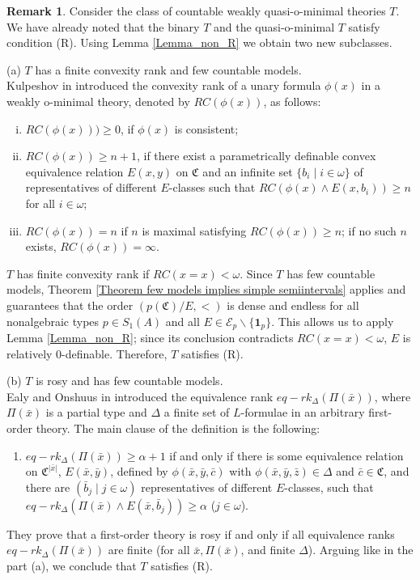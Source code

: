 \documentclass{amsart}
\theoremstyle{definition}
\theoremstyle{definition}
\newtheorem{Remark}[Theorem]{Remark}
\newcommand{\Mon}{\mathfrak C}
\begin{document}
\begin{Remark}\label{Rematk_finconv_rosywom} Consider the class of countable weakly quasi-o-minimal theories $T$. We have already noted that the binary $T$ and the quasi-o-minimal $T$ satisfy condition (R). Using Lemma \ref{Lemma_non_R} we obtain two new subclasses.

\smallskip 
(a) $T$ has a finite convexity rank and few countable models.\\
Kulpeshov in \cite{kulpeshov1998} introduced the convexity rank of a unary formula $\phi(x)$ in a weakly o-minimal theory, denoted by $RC(\phi(x))$, as follows:
\begin{enumerate}[(i)]
    \item   $RC(\phi(x))) \geqslant  0$, if $\phi(x)$ is consistent;
    \item   $RC(\phi(x))\geqslant n+1$, if there exist a parametrically deﬁnable convex equivalence relation $E(x, y)$ on $\Mon$ and an inﬁnite set $\{ b_i\mid i\in\omega\}$ of representatives of different $E$-classes such that $RC(\phi(x)\land E(x,b_i))\geqslant n$ for all $i\in\omega$;
    \item $RC(\phi(x))=n$ if $n$ is maximal satisfying $RC(\phi(x))\geqslant n$; if no such $n$ exists, $RC(\phi(x))=\infty$.   
\end{enumerate}
$T$ has finite convexity rank if $RC(x=x)<\omega$. Since $T$ has few countable models, Theorem \ref{Theorem few models implies simple semiintervals} applies and guarantees that the order $(p(\Mon)/E,<)$ is dense and endless for all nonalgebraic types $p\in S_1(A)$ and all $E\in \mathcal E_p\smallsetminus\{\mathbf 1_p\}$. This allows us to apply Lemma \ref{Lemma_non_R}; since its conclusion contradicts $RC(x=x)<\omega$, $E$ is relatively 0-definable. Therefore, $T$ satisfies (R). 

\smallskip 
(b) $T$ is rosy and has few countable models. \\
Ealy and Onshuus in \cite{ealy2007characterizing}
introduced the equivalence rank $eq-rk_{\Delta}(\Pi(\bar x))$, where $\Pi(\bar x)$ is a partial type and $\Delta$ a finite set of $L$-formulae in an arbitrary first-order theory. The main clause of the definition is the following: 
\begin{enumerate}[$\bullet$]
\item $eq-rk_{\Delta}(\Pi(\bar x))\geqslant \alpha+1$ if and only if there is some equivalence relation on $\Mon^{|\bar x|}$,
$E(\bar x,\bar y)$, defined by $\phi(\bar x,\bar y,\bar c)$ with $\phi(\bar x,\bar y,\bar z)\in \Delta$ and $\bar c\in\Mon$, and there are $(\bar b_j\mid j\in \omega)$ representatives of different $E$-classes, such that $eq-rk_{\Delta}(\Pi(\bar x)\land E(\bar x,\bar b_j))\geqslant\alpha$ ($j\in\omega$).
\end{enumerate}
They prove that a first-order theory is rosy if and only if all equivalence ranks $eq-rk_{\Delta}(\Pi(\bar x))$ are finite (for all $\bar x, \Pi(\bar x)$, and finite $\Delta$). 
Arguing like in the part (a), we conclude that $T$ satisfies (R).
\end{Remark}
  
\end{document}

